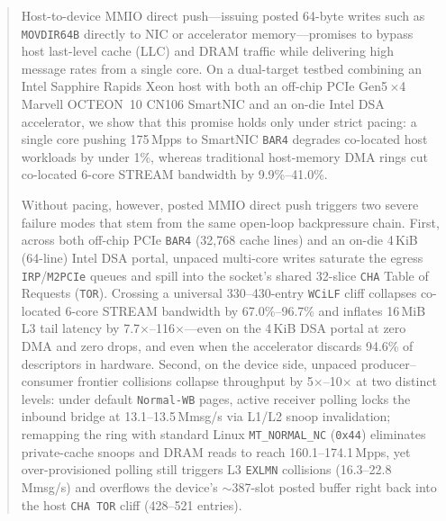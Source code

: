 \begin{abstract}
Host-to-device MMIO direct push---issuing posted 64-byte writes such as \texttt{MOVDIR64B} directly to NIC or accelerator memory---promises to bypass host last-level cache (LLC) and DRAM traffic while delivering high message rates from a single core. On a dual-target testbed combining an Intel Sapphire Rapids Xeon host with both an off-chip PCIe Gen5\,$\times$4 Marvell OCTEON~10 CN106 SmartNIC and an on-die Intel DSA accelerator, we show that this promise holds only under strict pacing: a single core pushing 175\,Mpps to SmartNIC \texttt{BAR4} degrades co-located host workloads by under 1\%, whereas traditional host-memory DMA rings cut co-located 6-core STREAM bandwidth by 9.9\%--41.0\%.

Without pacing, however, posted MMIO direct push triggers two severe failure modes that stem from the same open-loop backpressure chain. First, across both off-chip PCIe \texttt{BAR4} (32,768 cache lines) and an on-die 4\,KiB (64-line) Intel DSA portal, unpaced multi-core writes saturate the egress \texttt{IRP}/\texttt{M2PCIe} queues and spill into the socket's shared 32-slice \texttt{CHA} Table of Requests (\texttt{TOR}). Crossing a universal 330--430-entry \texttt{WCiLF} cliff collapses co-located 6-core STREAM bandwidth by 67.0\%--96.7\% and inflates 16\,MiB L3 tail latency by 7.7$\times$--116$\times$---even on the 4\,KiB DSA portal at zero DMA and zero drops, and even when the accelerator discards 94.6\% of descriptors in hardware. Second, on the device side, unpaced producer--consumer frontier collisions collapse throughput by 5$\times$--10$\times$ at two distinct levels: under default \texttt{Normal-WB} pages, active receiver polling locks the inbound bridge at 13.1--13.5\,Mmsg/s via L1/L2 snoop invalidation; remapping the ring with standard Linux \texttt{MT\_NORMAL\_NC} (\texttt{0x44}) eliminates private-cache snoops and DRAM reads to reach 160.1--174.1\,Mpps, yet over-provisioned polling still triggers L3 \texttt{EXLMN} collisions (16.3--22.8\,Mmsg/s) and overflows the device's $\sim$387-slot posted buffer right back into the host \texttt{CHA TOR} cliff (428--521 entries).


\end{abstract}
